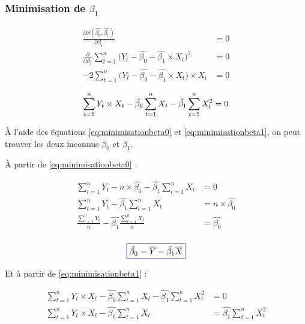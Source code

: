 \documentclass[11pt,french]{report}
\begin{document}
\subsubsection{Minimisation de $\beta_1$}
\begin{align*}
\frac{\partial S(\hat{\beta_0}, \hat{\beta_1})}{\partial \beta_1} &= 0 \\
\frac{\partial}{\partial \beta_1} \displaystyle\sum_{t=1}^n \big( Y_t - \hat{\beta_0} - \hat{\beta_1}\times X_t \big)^2 &= 0 \\
-2\displaystyle\sum_{t=1}^n \big( Y_t - \hat{\beta_0} - \hat{\beta_1} \times X_t \big) \times X_t &= 0 \\
\end{align*}
\begin{equation}
\label{eq:minimisationbeta1}
\displaystyle\sum_{t=1}^n Y_t \times X_t - \hat{\beta_0} \displaystyle\sum_{t=1}^n X_t - \hat{\beta_1} \displaystyle\sum_{t=1}^n X_t^2 = 0 \\
\end{equation}

À l'aide des équations \ref{eq:minimisationbeta0} et \ref{eq:minimisationbeta1}, on peut trouver les deux inconnus $\beta_0$ et $\beta_1$.

\bigskip
À partir de \ref{eq:minimisationbeta0} :

\begin{align*}
\displaystyle\sum_{t=1}^n Y_t - n \times \hat{\beta_0} - \hat{\beta_1} \displaystyle\sum_{t=1}^n X_t &= 0 \\
\displaystyle\sum_{t=1}^n Y_t - \hat{\beta_1} \displaystyle\sum_{t=1}^n X_t &=  n \times \hat{\beta_0} \\
\frac{\displaystyle\sum_{t=1}^n Y_t}{n} - \hat{\beta_1} \frac{\displaystyle\sum_{t=1}^n X_t}{n} &=  \hat{\beta_0} \\
\end{align*}

\begin{equation}
\label{eq:beta0}
\color{blue}
\boxed{\color{black}
\hat{\beta_0} = \overline{Y} - \hat{\beta_1} \overline{X}
}
\end{equation}

Et à partir de \ref{eq:minimisationbeta1} :

\begin{align*}
\displaystyle\sum_{t=1}^n Y_t \times X_t - \hat{\beta_0} \displaystyle\sum_{t=1}^n X_t - \hat{\beta_1} \displaystyle\sum_{t=1}^n X_t^2 &= 0 \\
\displaystyle\sum_{t=1}^n Y_t \times X_t - \hat{\beta_0} \displaystyle\sum_{t=1}^n X_t &=  \hat{\beta_1} \displaystyle\sum_{t=1}^n X_t^2 \\
\end{align*}
\end{document}
